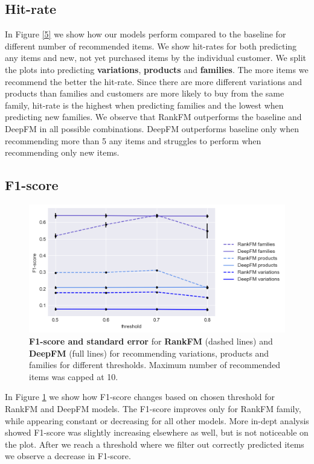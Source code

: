 \documentclass[fleqn,moreauthors,10pt]{ds_report}
\begin{document}
\subsection*{Hit-rate}

In Figure \ref{5} we show how our models perform compared to the baseline for different number of recommended items. We show hit-rates for both predicting any items and new, not yet purchased items by the individual customer. We split the plots into predicting \textbf{variations}, \textbf{products} and \textbf{families}. The more items we recommend the better the hit-rate. Since there are more different variations and products than families and customers are more likely to buy from the same family, hit-rate is the highest when predicting families and the lowest when predicting new families. We observe that RankFM outperforms the baseline and DeepFM in all possible combinations. DeepFM outperforms baseline only when recommending more than 5 any items and struggles to perform when recommending only new items.


\subsection*{F1-score}

\begin{figure}[H]\centering
	\includegraphics[width=\linewidth]{f1.png}
	\caption{\textbf{F1-score and standard error} for \textbf{RankFM} (dashed lines) and \textbf{DeepFM} (full lines) for recommending variations, products and families for different thresholds. Maximum number of recommended items was capped at 10.}
	\label{f1}
\end{figure}

In Figure \ref{f1} we show how F1-score changes based on chosen threshold for RankFM and DeepFM models. The F1-score improves only for RankFM family, while appearing constant or decreasing for all other models. More in-dept analysis showed F1-score was slightly increasing elsewhere as well, but is not noticeable on the plot. After we reach a threshold where we filter out correctly predicted items we observe a decrease in F1-score.
\end{document}
